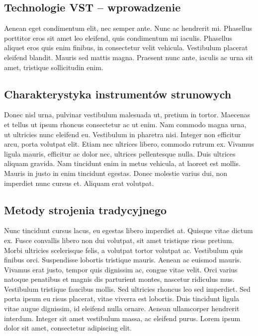 \subsection{Technologie VST – wprowadzenie}
\begin{spacing}{1.5} %
    Aenean eget condimentum elit, nec semper ante. Nunc ac hendrerit mi. Phasellus porttitor eros sit amet leo eleifend, quis condimentum mi iaculis. Phasellus aliquet eros quis enim finibus, in consectetur velit vehicula. Vestibulum placerat eleifend blandit. Mauris sed mattis magna. Praesent nunc ante, iaculis ac urna sit amet, tristique sollicitudin enim. 
\end{spacing} %

\subsection{Charakterystyka instrumentów strunowych}
\begin{spacing}{1.5} %
    Donec nisl urna, pulvinar vestibulum malesuada ut, pretium in tortor. Maecenas et tellus ut ipsum rhoncus consectetur ac ut enim. Nam commodo magna urna, ut ultricies nunc eleifend eu. Vestibulum in pharetra nisi. Integer non efficitur arcu, porta volutpat elit. Etiam nec ultrices libero, commodo rutrum ex. Vivamus ligula mauris, efficitur ac dolor nec, ultrices pellentesque nulla. Duis ultrices aliquam gravida. Nam tincidunt enim in metus vehicula, at laoreet est mollis. Mauris in justo in enim tincidunt egestas. Donec molestie varius dui, non imperdiet nunc cursus et. Aliquam erat volutpat. 
\end{spacing} %

\subsection{Metody strojenia tradycyjnego}
\begin{spacing}{1.5} %
    Nunc tincidunt cursus lacus, eu egestas libero imperdiet at. Quisque vitae dictum ex. Fusce convallis libero non dui volutpat, sit amet tristique risus pretium. Morbi ultricies scelerisque felis, a volutpat tortor volutpat ac. Vestibulum quis finibus orci. Suspendisse lobortis tristique mauris. Aenean ac euismod mauris. Vivamus erat justo, tempor quis dignissim ac, congue vitae velit. Orci varius natoque penatibus et magnis dis parturient montes, nascetur ridiculus mus. Vestibulum tristique faucibus mollis. Sed ultricies rhoncus leo sed imperdiet. Sed porta ipsum eu risus placerat, vitae viverra est lobortis. Duis tincidunt ligula vitae augue dignissim, id eleifend nulla ornare. Aenean ullamcorper hendrerit interdum. Integer sit amet vestibulum massa, ac eleifend purus. Lorem ipsum dolor sit amet, consectetur adipiscing elit. 
\end{spacing} %

